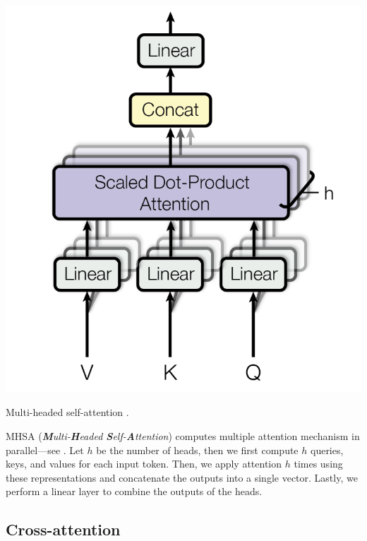 \begin{marginfigure}
    \includegraphics[width=\textwidth]{figures/mhsa}
    \caption{Multi-headed self-attention \citep{vaswani2017attention}.}
    \label{fig:mhsa}
\end{marginfigure}

MHSA (\textit{\textbf{M}ulti-\textbf{H}eaded \textbf{S}elf-\textbf{A}ttention}) computes multiple
attention mechanism in parallel---see . Let $h$ be the number of heads, then we
first compute $h$ queries, keys, and values for each input token. Then, we apply attention $h$ times using these representations and concatenate the
outputs into a single vector. Lastly, we perform a linear layer to combine the outputs of the
heads.

\subsection{Cross-attention}

